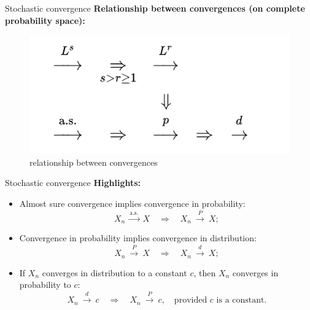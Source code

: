 \documentclass [aspectratio=169]{beamer}
\begin{document}
\begin{frame}{Stochastic convergence}
    \textbf{Relationship between convergences (on complete probability space):}\\
    \begin{figure}
        \centering
        \includegraphics{convergence.png}
        \caption{relationship between convergences}
        \label{fig:my_label}
    \end{figure}
\end{frame}

\begin{frame}{Stochastic convergence}
\textbf{Highlights:}
    \begin{itemize}
        \item Almost sure convergence implies convergence in probability:
        $${\displaystyle X_{n}\ {\xrightarrow {\text{a.s.}}}\ X\quad \Rightarrow \quad X_{n}\ {\xrightarrow {\overset {}{P}}}\ X};$$
        \item Convergence in probability implies convergence in distribution:
        $$
        {\displaystyle X_{n}\ {\xrightarrow {\overset {}{P}}}\ X\quad \Rightarrow \quad X_{n}\ {\xrightarrow {\overset {}{d}}}\ X};
        $$
        \item If $X_n$ converges in distribution to a constant $c$, then $X_n$ converges in probability to $c$:
$$
X_{n}\ {\xrightarrow {\overset {}{d}}}\ c\quad \Rightarrow \quad X_{n}\ {\xrightarrow {\overset {}{P}}}\ c, \quad \text{provided $c$ is a constant}.
$$
    \end{itemize}
\end{frame}
\end{document}
